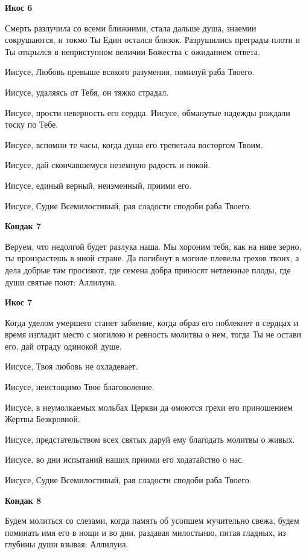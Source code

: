 \bfseries Икос 6\normalfont{}


Смерть разлучила со всеми ближними, стала дальше душа, знаемии сокрушаются, и токмо Ты Един остался близок. Разрушились преграды плоти и Ты открылся в неприступном величии Божества с ожиданием ответа. 


Иисусе, Любовь превыше всякого разумения, помилуй раба Твоего. 


Иисусе, удаляясь от Тебя, он тяжко страдал. 


Иисусе, прости неверность его сердца. Иисусе, обманутые надежды рождали тоску по Тебе. 


Иисусе, вспомни те часы, когда душа его трепетала восторгом Твоим. 


Иисусе, дай скончавшемуся неземную радость и покой. 


Иисусе, единый верный, неизменный, приими его. 


Иисусе, Судие Всемилостивый, рая сладости сподоби раба Твоего.




\bfseries Кондак 7\normalfont{}


Веруем, что недолгой будет разлука наша. Мы хороним тебя, как на ниве зерно, ты произрастешь в иной стране. Да погибнут в могиле плевелы грехов твоих, а дела добрые там просияют, где семена добра приносят нетленные плоды, где души святые поют: Аллилуиа.




\bfseries Икос 7\normalfont{}


Когда уделом умершего станет забвение, когда образ его поблекнет в сердцах и время изгладит место с могилою и ревность молитвы о нем, тогда Ты не остави его, дай отраду одинокой душе. 


Иисусе, Твоя любовь не охладевает. 


Иисусе, неистощимо Твое благоволение. 


Иисусе, в неумолкаемых мольбах Церкви да омоются грехи его приношением Жертвы Безкровной. 


Иисусе, предстательством всех святых даруй ему благодать молитвы о живых. 


Иисусе, во дни испытаний наших приими его ходатайство о нас. 


Иисусе, Судие Всемилостивый, рая сладости сподоби раба Твоего.




\bfseries Кондак 8\normalfont{}


Будем молиться со слезами, когда память об усопшем мучительно свежа, будем поминать имя его в нощи и во дни, раздавая милостыню, питая гладных, из глубины души взывая: Аллилуиа.




